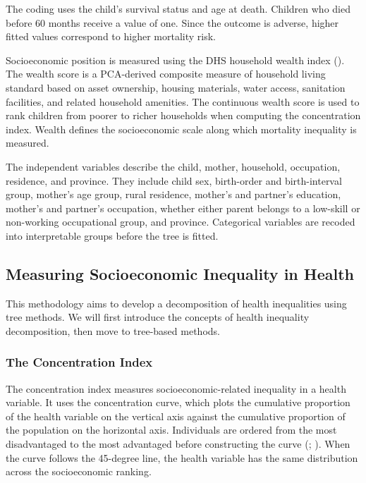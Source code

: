 \documentclass[
  11pt,
  a4paper,
]{article}
\begin{document}
The coding uses the child's survival status and age at death. Children
who died before 60 months receive a value of one. Since the outcome is
adverse, higher fitted values correspond to higher mortality risk.

Socioeconomic position is measured using the DHS household wealth index
(). The wealth score is a PCA-derived composite measure of household
living standard based on asset ownership, housing materials, water
access, sanitation facilities, and related household amenities. The
continuous wealth score is used to rank children from poorer to richer
households when computing the concentration index. Wealth defines the
socioeconomic scale along which mortality inequality is measured.

The independent variables describe the child, mother, household,
occupation, residence, and province. They include child sex, birth-order
and birth-interval group, mother's age group, rural residence, mother's
and partner's education, mother's and partner's occupation, whether
either parent belongs to a low-skill or non-working occupational group,
and province. Categorical variables are recoded into interpretable
groups before the tree is fitted.

\subsection{Measuring Socioeconomic Inequality in
Health}\label{sec-measuring-socioeconomic-inequality}

This methodology aims to develop a decomposition of health inequalities
using tree methods. We will first introduce the concepts of health
inequality decomposition, then move to tree-based methods.

\subsubsection{The Concentration Index}\label{sec-concentration-index}

The concentration index measures socioeconomic-related inequality in a
health variable. It uses the concentration curve, which plots the
cumulative proportion of the health variable on the vertical axis
against the cumulative proportion of the population on the horizontal
axis. Individuals are ordered from the most disadvantaged to the most
advantaged before constructing the curve
(; ). When the curve follows the 45-degree
line, the health variable has the same distribution across the
socioeconomic ranking.
\end{document}
